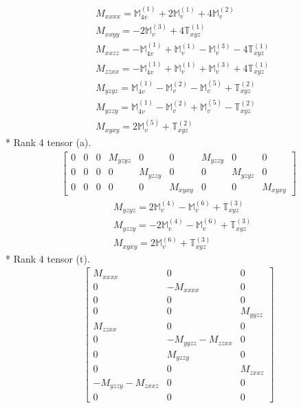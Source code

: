\documentclass[fleqn,8pt,landscape]{jsarticle}
\begin{document}
\begin{align*}
& M_{xxxx} = \mathbb{M}_{4v}^{(1)} + 2 \mathbb{M}_{v}^{(1)} + 4 \mathbb{M}_{v}^{(2)} \\
& M_{xxyy} = - 2 \mathbb{M}_{v}^{(3)} + 4 \mathbb{T}_{xyz}^{(1)} \\
& M_{xxzz} = - \mathbb{M}_{4v}^{(1)} + \mathbb{M}_{v}^{(1)} - \mathbb{M}_{v}^{(3)} - 4 \mathbb{T}_{xyz}^{(1)} \\
& M_{zzxx} = - \mathbb{M}_{4v}^{(1)} + \mathbb{M}_{v}^{(1)} + \mathbb{M}_{v}^{(3)} + 4 \mathbb{T}_{xyz}^{(1)} \\
& M_{yzyz} = \mathbb{M}_{4v}^{(1)} - \mathbb{M}_{v}^{(2)} - \mathbb{M}_{v}^{(5)} + \mathbb{T}_{xyz}^{(2)} \\
& M_{yzzy} = \mathbb{M}_{4v}^{(1)} - \mathbb{M}_{v}^{(2)} + \mathbb{M}_{v}^{(5)} - \mathbb{T}_{xyz}^{(2)} \\
& M_{xyxy} = 2 \mathbb{M}_{v}^{(5)} + \mathbb{T}_{xyz}^{(2)}
\end{align*}
* Rank 4 tensor (a).
\begin{align*}
\begin{bmatrix} 0 & 0 & 0 & M_{yzyz} & 0 & 0 & M_{yzzy} & 0 & 0 \\ 0 & 0 & 0 & 0 & M_{yzzy} & 0 & 0 & M_{yzyz} & 0 \\ 0 & 0 & 0 & 0 & 0 & M_{xyxy} & 0 & 0 & M_{xyxy} \end{bmatrix}
\end{align*}
\begin{align*}
& M_{yzyz} = 2 \mathbb{M}_{v}^{(4)} - \mathbb{M}_{v}^{(6)} + \mathbb{T}_{xyz}^{(3)} \\
& M_{yzzy} = - 2 \mathbb{M}_{v}^{(4)} - \mathbb{M}_{v}^{(6)} + \mathbb{T}_{xyz}^{(3)} \\
& M_{xyxy} = 2 \mathbb{M}_{v}^{(6)} + \mathbb{T}_{xyz}^{(3)}
\end{align*}
* Rank 4 tensor (t).
\begin{align*}
\begin{bmatrix} M_{xxxx} & 0 & 0 \\ 0 & - M_{xxxx} & 0 \\ 0 & 0 & 0 \\ 0 & 0 & M_{yyzz} \\ M_{zzxx} & 0 & 0 \\ 0 & - M_{yyzz} - M_{zzxx} & 0 \\ 0 & M_{yzzy} & 0 \\ 0 & 0 & M_{zxxz} \\ - M_{yzzy} - M_{zxxz} & 0 & 0 \\ 0 & 0 & 0 \end{bmatrix}
\end{align*}
\end{document}
